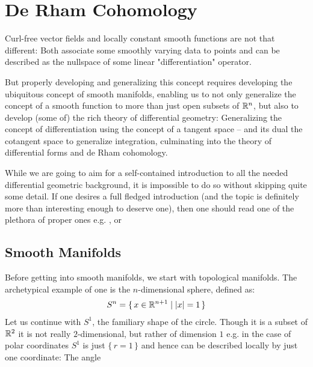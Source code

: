 \chapter{De Rham Cohomology}
Curl-free vector fields and locally constant smooth functions are not that different: Both associate
some smoothly varying data to points and can be described as the nullspace of some linear
"differentiation" operator.

But properly developing and generalizing this concept requires developing the ubiquitous concept 
of smooth manifolds, enabling us to not only generalize the concept of a smooth function to more than
just open subsets of $\mathbb{R}^n$, but also to develop (some of) the rich theory of differential geometry:  
Generalizing the concept of differentiation using the concept of a tangent space – and its dual
the cotangent space to generalize integration, culminating into the theory of differential forms
and de Rham cohomology.

\begin{remark}
While we are going to aim for a self-contained introduction to all the needed differential geometric
background, it is impossible to do so without skipping quite some detail. If one desires a full fledged
introduction (and the topic is definitely more than interesting enough to deserve one), then one should
read one of the plethora of proper ones e.g. \cite{lee_introduction_2013},
\cite{spivak_comprehensive_1979} or \cite{wendl_differential_2022}
\end{remark}

\section{Smooth Manifolds}
Before getting into smooth manifolds, we start with topological manifolds. The archetypical example of one is
the $n$-dimensional sphere, defined as:
\begin{align*}
	S^n = \{\, x \in \mathbb{R}^{n + 1} \mid |x| = 1  \,\}
\end{align*}
Let us continue with $S^1$, the familiary shape of the circle. Though it is a subset of $\mathbb{R}^2$ it
is not really $2$-dimensional, but rather of dimension $1$ e.g. in the case of polar coordinates $S^1$
is just $\{\, r = 1 \,\}$ and hence can be described locally by just one coordinate: The angle

